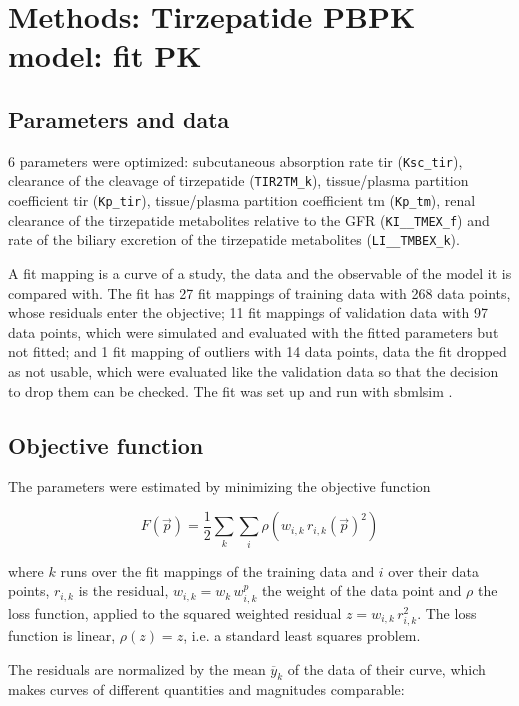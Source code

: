 \section{Methods: Tirzepatide PBPK model: fit PK}

\subsection{Parameters and data}

6 parameters were optimized: subcutaneous absorption rate tir (\texttt{Ksc\_tir}), clearance of the cleavage of tirzepatide (\texttt{TIR2TM\_k}), tissue/plasma partition coefficient tir (\texttt{Kp\_tir}), tissue/plasma partition coefficient tm (\texttt{Kp\_tm}), renal clearance of the tirzepatide metabolites relative to the GFR (\texttt{KI\_\_TMEX\_f}) and rate of the biliary excretion of the tirzepatide metabolites (\texttt{LI\_\_TMBEX\_k}).

A fit mapping is a curve of a study, the data and the observable of the model it is compared with. The fit has 27 fit mappings of training data with 268 data points, whose residuals enter the objective; 11 fit mappings of validation data with 97 data points, which were simulated and evaluated with the fitted parameters but not fitted; and 1 fit mapping of outliers with 14 data points, data the fit dropped as not usable, which were evaluated like the validation data so that the decision to drop them can be checked. The fit was set up and run with sbmlsim \cite{Koenig2026_sbmlsim}.

\subsection{Objective function}

The parameters were estimated by minimizing the objective function

\begin{equation}
F(\vec{p}) = \frac{1}{2} \sum_{k} \sum_{i} \rho\left(w_{i,k}\, r_{i,k}(\vec{p})^2\right)
\end{equation}

where $k$ runs over the fit mappings of the training data and $i$ over their data points, $r_{i,k}$ is the residual, $w_{i,k} = w_k\, w^{p}_{i,k}$ the weight of the data point and $\rho$ the loss function, applied to the squared weighted residual $z = w_{i,k}\, r_{i,k}^2$. The loss function is linear, $\rho(z) = z$, i.e. a standard least squares problem.

The residuals are normalized by the mean $\overline{y}_k$ of the data of their curve, which makes curves of different quantities and magnitudes comparable:

